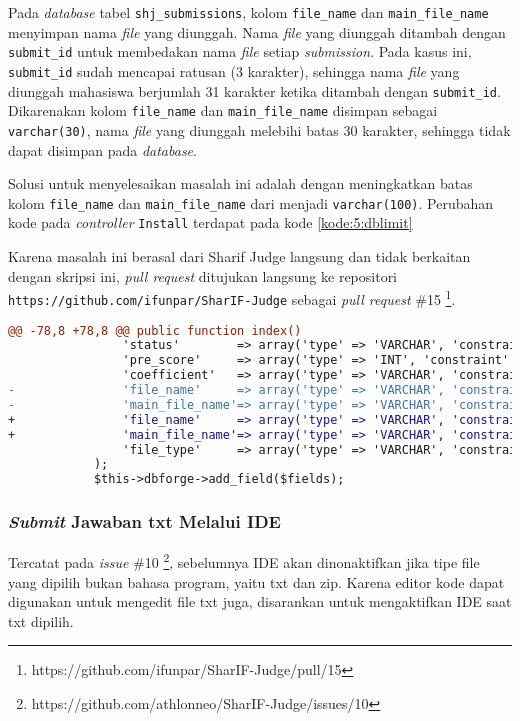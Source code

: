 Pada \textit{database} tabel \verb|shj_submissions|, kolom \verb|file_name| dan \verb|main_file_name| menyimpan nama \textit{file} yang diunggah. Nama \textit{file} yang diunggah ditambah dengan \verb|submit_id| untuk membedakan nama \textit{file} setiap \textit{submission}. Pada kasus ini, \verb|submit_id| sudah mencapai ratusan (3 karakter), sehingga nama \textit{file} yang diunggah mahasiswa berjumlah 31 karakter ketika ditambah dengan \verb|submit_id|. Dikarenakan kolom \verb|file_name| dan \verb|main_file_name| disimpan sebagai \verb|varchar(30)|, nama \textit{file} yang diunggah melebihi batas 30 karakter, sehingga tidak dapat disimpan pada \textit{database}.

Solusi untuk menyelesaikan masalah ini adalah dengan meningkatkan batas kolom \verb|file_name| dan \verb|main_file_name| dari menjadi \verb|varchar(100)|. Perubahan kode pada \textit{controller} \verb|Install| terdapat pada kode \ref{kode:5:dblimit}

Karena masalah ini berasal dari Sharif Judge langsung dan tidak berkaitan dengan skripsi ini, \textit{pull request} ditujukan langsung ke repositori \verb|https://github.com/ifunpar/SharIF-Judge| sebagai \textit{pull request} \#15 \footnote{https://github.com/ifunpar/SharIF-Judge/pull/15}.

\begin{lstlisting}[language=diff, caption=Perubahan pada \texttt{Install.php}, label=kode:5:dblimit]
@@ -78,8 +78,8 @@ public function index()
				'status'        => array('type' => 'VARCHAR', 'constraint' => 100),
				'pre_score'     => array('type' => 'INT', 'constraint' => 11),
				'coefficient'   => array('type' => 'VARCHAR', 'constraint' => 6),
-				'file_name'     => array('type' => 'VARCHAR', 'constraint' => 30),
-				'main_file_name'=> array('type' => 'VARCHAR', 'constraint' => 30),
+				'file_name'     => array('type' => 'VARCHAR', 'constraint' => 100),
+				'main_file_name'=> array('type' => 'VARCHAR', 'constraint' => 100),
				'file_type'     => array('type' => 'VARCHAR', 'constraint' => 6),
			);
			$this->dbforge->add_field($fields);
\end{lstlisting}

\subsubsection{\textit{Submit} Jawaban txt Melalui IDE}
Tercatat pada \textit{issue} \#10 \footnote{https://github.com/athlonneo/SharIF-Judge/issues/10}, sebelumnya IDE akan dinonaktifkan jika tipe file yang dipilih bukan bahasa program, yaitu txt dan zip. Karena editor kode dapat digunakan untuk mengedit file txt juga, disarankan untuk mengaktifkan IDE saat txt dipilih.

